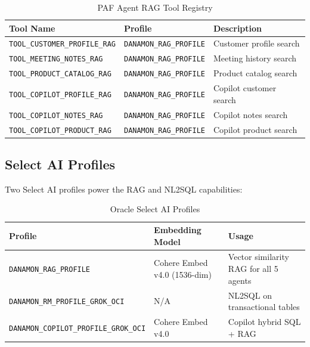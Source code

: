 \documentclass[12pt,a4paper]{article}
\begin{document}
\begin{table}[H]
\centering
\caption{PAF Agent RAG Tool Registry}
\begin{tabularx}{\textwidth}{l l X}
\toprule
\textbf{Tool Name} & \textbf{Profile} & \textbf{Description} \\
\midrule
\texttt{TOOL\_CUSTOMER\_PROFILE\_RAG} & \texttt{DANAMON\_RAG\_PROFILE} & Customer profile search \\
\texttt{TOOL\_MEETING\_NOTES\_RAG} & \texttt{DANAMON\_RAG\_PROFILE} & Meeting history search \\
\texttt{TOOL\_PRODUCT\_CATALOG\_RAG} & \texttt{DANAMON\_RAG\_PROFILE} & Product catalog search \\
\texttt{TOOL\_COPILOT\_PROFILE\_RAG} & \texttt{DANAMON\_RAG\_PROFILE} & Copilot customer search \\
\texttt{TOOL\_COPILOT\_NOTES\_RAG} & \texttt{DANAMON\_RAG\_PROFILE} & Copilot notes search \\
\texttt{TOOL\_COPILOT\_PRODUCT\_RAG} & \texttt{DANAMON\_RAG\_PROFILE} & Copilot product search \\
\bottomrule
\end{tabularx}
\end{table}

\subsection{Select AI Profiles}

Two Select AI profiles power the RAG and NL2SQL capabilities:

\begin{table}[H]
\centering
\caption{Oracle Select AI Profiles}
\begin{tabularx}{\textwidth}{l l X}
\toprule
\textbf{Profile} & \textbf{Embedding Model} & \textbf{Usage} \\
\midrule
\texttt{DANAMON\_RAG\_PROFILE} & Cohere Embed v4.0 (1536-dim) & Vector similarity RAG for all 5 agents \\
\texttt{DANAMON\_RM\_PROFILE\_GROK\_OCI} & N/A & NL2SQL on transactional tables \\
\texttt{DANAMON\_COPILOT\_PROFILE\_GROK\_OCI} & Cohere Embed v4.0 & Copilot hybrid SQL + RAG \\
\bottomrule
\end{tabularx}
\end{table}

\end{document}

